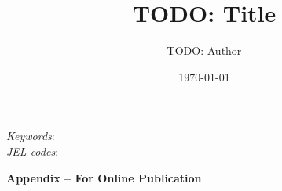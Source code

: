 \documentclass[11pt]{article}
\title{TODO: Title}
\author{TODO: Author}
\date{\today}
\begin{document}



\maketitle
\begin{abstract}
\end{abstract}
\vspace{1cm}
{\small
\noindent \textit{Keywords}:  \\
\textit{JEL codes}: 
}
\thispagestyle{empty}
\newpage
\setcounter{page}{1}



%
%
%


{}

\newpage
\clearpage

\begin{center} \Large \textbf{Appendix -- For Online Publication} \end{center}
\appendix
{}

%
%
%
\end{document}
